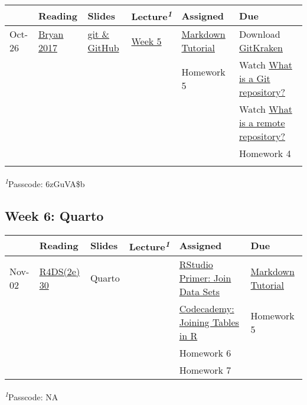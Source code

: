 \documentclass[
  letterpaper,
  DIV=11,
  numbers=noendperiod]{scrartcl}
\begin{document}
\setlength{\LTpost}{0mm}
\begin{longtable*}{llllll}
\toprule
 & Reading & Slides & Lecture\textsuperscript{\textit{1}} & Assigned & Due \\ 
\midrule\addlinespace[2.5pt]
Oct-26 & \href{https://peerj.com/preprints/3159v2/}{Bryan 2017} & \href{https://datalorax.github.io/git_talk/}{git \& GitHub} & \href{https://uoregon.zoom.us/rec/share/xlFoihkbojp-CpRBmnuIxZ54302zCt3NOvEqwIUvUgR8maF1WIeKXNoGCqy2SjR-.Rpuy5MTAT5GKNYod}{Week 5} & \href{https://www.markdowntutorial.com/}{Markdown Tutorial} & Download \href{https://www.gitkraken.com/}{GitKraken} \\ 
 &  &  &  & Homework 5 & Watch \href{https://www.youtube.com/watch?v=A-4WltCTVms\&list=PLe6EXFvnTV7-_41SpakZoTIYCgX4aMTdU\&index=3}{What is a Git repository?} \\ 
 &  &  &  &  & Watch \href{https://www.youtube.com/watch?v=Lb4yvfrX_7I\&list=PLe6EXFvnTV7-_41SpakZoTIYCgX4aMTdU\&index=3}{What is a remote repository?} \\ 
 &  &  &  &  & Homework 4 \\ 
 &  &  &  &  &  \\ 
\bottomrule
\end{longtable*}
\begin{minipage}{\linewidth}
\textsuperscript{\textit{1}}Passcode: 6zGuVA\$b\\
\end{minipage}

\hypertarget{week-6-quarto}{%
\subsection{Week 6: Quarto}\label{week-6-quarto}}

\setlength{\LTpost}{0mm}
\begin{longtable*}{llllll}
\toprule
 & Reading & Slides & Lecture\textsuperscript{\textit{1}} & Assigned & Due \\ 
\midrule\addlinespace[2.5pt]
Nov-02 & \href{https://r4ds.hadley.nz/quarto-formats}{R4DS(2e) 30} & {Quarto} &  & \href{https://posit.cloud/learn/primers/4.3}{RStudio Primer: Join Data Sets} & \href{https://www.markdowntutorial.com/}{Markdown Tutorial} \\ 
 &  &  &  & \href{https://www.codecademy.com/courses/learn-r/lessons/r-multiple-tables/exercises/introduction}{Codecademy: Joining Tables in R} & Homework 5 \\ 
 &  &  &  & Homework 6 &  \\ 
 &  &  &  & Homework 7 &  \\ 
\bottomrule
\end{longtable*}
\begin{minipage}{\linewidth}
\textsuperscript{\textit{1}}Passcode: NA\\
\end{minipage}
\end{document}
